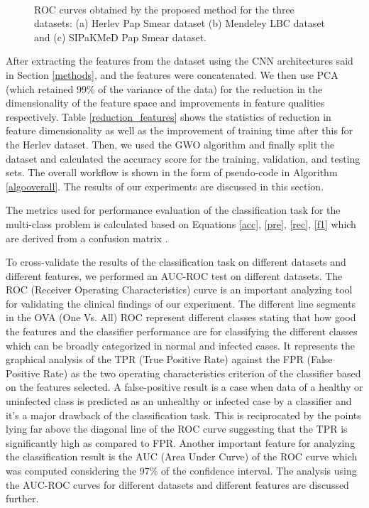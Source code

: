 \documentclass{llncs}
\begin{document}
\begin{figure*}
    \centering
    \\
    \caption{ROC curves obtained by the proposed method for the three datasets: (a) Herlev Pap Smear dataset (b) Mendeley LBC dataset and (c) SIPaKMeD Pap Smear dataset.}
    \label{roc}
\end{figure*}

After extracting the features from the dataset using the CNN architectures said in Section \ref{methods}, and the features were concatenated. We then use PCA (which retained 99\% of the variance of the data) for the reduction in the dimensionality of the feature space and improvements in feature qualities respectively. Table \ref{reduction_features} shows the statistics of reduction in feature dimensionality as well as the improvement of training time after this for the Herlev dataset. Then, we used the GWO algorithm and finally split the dataset and calculated the accuracy score for the training, validation, and testing sets. The overall workflow is shown in the form of pseudo-code in Algorithm \ref{algooverall}. The results of our experiments are discussed in this section.

The metrics used for performance evaluation of the classification task for the multi-class problem is calculated based on Equations \ref{acc}, \ref{pre}, \ref{rec}, \ref{f1} which are derived from a confusion matrix .




To cross-validate the results of the classification task on different datasets and different features, we performed an AUC-ROC test on different datasets. The ROC (Receiver Operating Characteristics) curve is an important analyzing tool for validating the clinical findings of our experiment. The different line segments in the OVA (One Vs. All) ROC represent different classes stating that how good the features and the classifier performance are for classifying the different classes which can be broadly categorized in normal and infected cases. It represents the graphical analysis of the TPR (True Positive Rate) against the FPR (False Positive Rate) as the two operating characteristics criterion of the classifier based on the features selected. A false-positive result is a case when data of a healthy or uninfected class is predicted as an unhealthy or infected case by a classifier and it’s a major drawback of the classification task. This is reciprocated by the points lying far above the diagonal line of the ROC curve suggesting that the TPR is significantly high as compared to FPR. Another important feature for analyzing the classification result is the AUC (Area Under Curve) of the ROC curve which was computed considering the 97\% of the confidence interval. The analysis using the AUC-ROC curves for different datasets and different features are discussed further.
\end{document}
